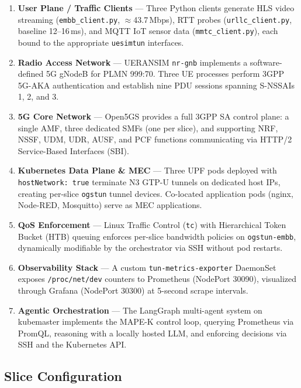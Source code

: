 \documentclass[12pt]{article}
\begin{document}
\begin{enumerate}[leftmargin=*,label=\textbf{L\arabic*.}]
  \item \textbf{User Plane / Traffic Clients} --- Three Python clients
    generate HLS video streaming (\texttt{embb\_client.py},
    $\approx$43.7\,Mbps), RTT probes (\texttt{urllc\_client.py},
    baseline 12--16\,ms), and MQTT IoT sensor data
    (\texttt{mmtc\_client.py}), each bound to the appropriate
    \texttt{uesimtun} interfaces.
  \item \textbf{Radio Access Network} --- UERANSIM \texttt{nr-gnb}
    implements a software-defined 5G gNodeB for PLMN 999:70. Three UE
    processes perform 3GPP 5G-AKA authentication and establish nine PDU
    sessions spanning S-NSSAIs 1, 2, and 3.
  \item \textbf{5G Core Network} --- Open5GS provides a full 3GPP SA
    control plane: a single AMF, three dedicated SMFs (one per slice),
    and supporting NRF, NSSF, UDM, UDR, AUSF, and PCF functions
    communicating via HTTP/2 Service-Based Interfaces (SBI).
  \item \textbf{Kubernetes Data Plane \& MEC} --- Three UPF pods deployed
    with \texttt{hostNetwork: true} terminate N3 GTP-U tunnels on
    dedicated host IPs, creating per-slice \texttt{ogstun} tunnel
    devices. Co-located application pods (nginx, Node-RED, Mosquitto)
    serve as MEC applications.
  \item \textbf{QoS Enforcement} --- Linux Traffic Control (\texttt{tc})
    with Hierarchical Token Bucket (HTB) queuing enforces per-slice
    bandwidth policies on \texttt{ogstun-embb}, dynamically modifiable
    by the orchestrator via SSH without pod restarts.
  \item \textbf{Observability Stack} --- A custom
    \texttt{tun-metrics-exporter} DaemonSet exposes
    \texttt{/proc/net/dev} counters to Prometheus (NodePort 30090),
    visualized through Grafana (NodePort 30300) at 5-second scrape
    intervals.
  \item \textbf{Agentic Orchestration} --- The LangGraph multi-agent
    system on kubemaster implements the MAPE-K control loop, querying
    Prometheus via PromQL, reasoning with a locally hosted LLM, and
    enforcing decisions via SSH and the Kubernetes API.
\end{enumerate}

\subsection{Slice Configuration}
\end{document}
